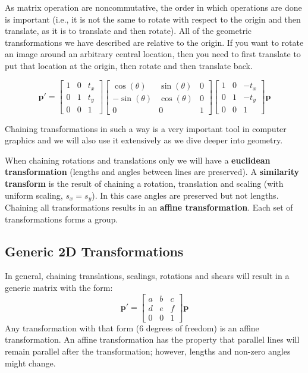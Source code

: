 As matrix operation are noncommutative, the order in which operations are done is important (i.e., it is not the same to rotate with respect to the origin and then translate, as it is to translate and then rotate). All of the geometric transformations we have described are relative to the origin. If you want to rotate an image around an arbitrary central location, then you need to first translate to put that location at the origin, then rotate and then translate back. 

\begin{equation}
    \mathbf{p}' = 
    \begin{bmatrix}
    1 & 0 & t_x \\
    0 & 1 & t_y \\
    0 & 0 & 1
    \end{bmatrix}
    \begin{bmatrix}
    \cos(\theta) & \sin(\theta) & 0 \\
    -\sin(\theta) & \cos(\theta) & 0 \\
    0 & 0 & 1
    \end{bmatrix}
    \begin{bmatrix}
    1 & 0 & -t_x \\
    0 & 1 & -t_y \\
    0 & 0 & 1
    \end{bmatrix}
    \mathbf{p}
\end{equation}

Chaining transformations in such a way is a very important tool in computer graphics and we will also use it extensively as we dive deeper into geometry. 

When chaining rotations and translations only we will have a {\bf euclidean transformation} 
(lengths and angles between lines are preserved). A {\bf similarity transform}
is the result of chaining a rotation, translation and scaling (with uniform scaling, $s_x=s_y$). In this case angles are preserved but not lengths. Chaining all transformations results in an {\bf affine transformation}. 
Each set of transformations forms a group.  

\subsection{Generic 2D Transformations}

In general, chaining translations, scalings, rotations and shears will result in a generic matrix with the form:
\begin{equation}
    \mathbf{p}' = 
    \begin{bmatrix}
    a & b & c \\
    d & e & f \\
    0 & 0 & 1
    \end{bmatrix}
    \mathbf{p}
\end{equation}
Any transformation with that form (6 degrees of freedom) is an affine transformation. An affine transformation has the property that parallel lines will remain parallel after the transformation; however, lengths and non-zero angles might change. 


